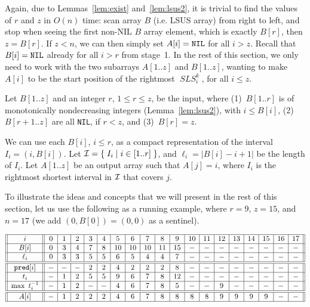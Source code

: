 \documentclass[11pt]{llncs}
\DeclareMathOperator{\sls}{\mathit{SLS}}
\newcommand\pred{\mathtt{pred}}
\begin{document}
Again, due to Lemmas~\ref{lem:exist} and~\ref{lem:lsus2}, it is trivial
to find the values of $r$ and $z$ in $O(n)$ time: scan array $B$ (i.e.
LSUS array) from right to left, and stop when seeing the first
non-NIL $B$ array element, which is exactly $B[r]$, then $z = B[r]$.
If $z<n$, we can then simply set $A[i]={\tt NIL}$
for all $i>z$. Recall that $B[i]={\tt NIL}$
already for all $i>r$ from stage~1. In the rest of this section, we 
only need to work with the two subarrays $A[1..z]$ and $B[1..z]$, 
wanting to make $A[i]$ to be the start position of the rightmost
$\sls_i^k$, for all $i\leq z$.




Let $B[1..z]$ and an integer $r$, $1\leq r\leq z$, be the input, where
(1)~$B[1..r]$ is of monotonically nondecreasing integers
(Lemma~\ref{lem:lsus2}), with $i \leq B[i]$, (2)~$B[r+1.. z]$ are
all {\tt NIL}, if $r<z$, and (3)~$B[r]=z$.

We can use each $B[i]$, $i\leq r$, as a compact representation of the
interval $I_i=(i, B[i])$. Let ${\cal I} = \{\; I_i \mid i \in [1..r] \;
\}$, and $\ell_i = |B[i] - i + 1|$ be the length of $I_i$. Let
$A[1..z]$ be an output array such that $A[j]=i$, where $I_i$ is the
rightmost shortest interval in ${\cal I}$ that covers $j$.

\medskip

To illustrate the ideas and
concepts that we will present in the rest of this section, 
let us use the following as a running example, 
where $r=9$, $z=15$, and $n=17$
(we add
$(0,B[0])=(0,0)$ as a sentinel).

{\small
\begin{center}
$
\begin{array}{||c||c|c|c|c|c|c|c|c|c|c|c|c|c|c|c|c|c|c||}
\hline 
i & 0   &  1 &  2 &  3 &  4 &  5 &  6 &  7 &  8 &  9 & 10 & 11 & 12 &
13 & 14 & 15 & 16 & 17 \\\hline
B[i] & 0 &  3 &  4 &  7 &  8 & 10 & 10 & 10 & 11 & 15 & - & - & - & -
& - & - & - & - \\\hline
\ell_i & 0 &  3 &  3 &  5 &  5 &  6 &  5 &  4 &  4 &  7 & - & - & - & -
& - & - & - & - \\ \hline \hline
\pred[i] & - & -& -&  2 &  2 &  4 &  2 &  2 &  2 &  8 & -& -& -& -& -&
-& -& -\\\hline
t_i  & - &  1 &  2 &  5 &  5 &  9 &  6 &  7 &  8 & 12 & -& -& -& -& -&
-& -& -\\\hline
\max\ t_i^{-1} & - &  1 &  2 & -& -&  4 &  6 &  7 &  8 &  5 & -& -&  9 & -&
-& -& -& -\\\hline\hline
A[i]  & - &  1 &  2 &  2 &  2 &  4 &  6 &  7 &  8 &  8 &  8 &  8 &  9
&  9 &  9 &  9 & -& -\\\hline
\end{array}
$
\end{center}
}
\end{document}

